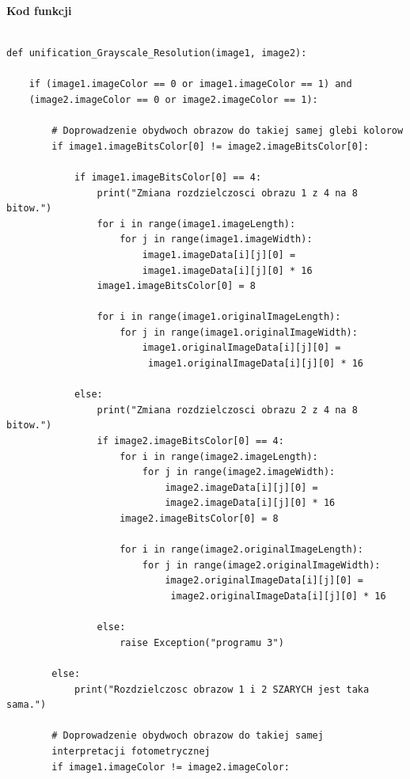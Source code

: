 \documentclass[magisterska,openany]{pracadypl}
\begin{document}
\newpage
\textbf{\Large Kod funkcji}
   
\lstset{language=Python}
\vspace{0.25cm}
\begin{lstlisting}[caption={Rozdzielczościowe ujednolicanie obrazów szarych}]

def unification_Grayscale_Resolution(image1, image2):
   
    if (image1.imageColor == 0 or image1.imageColor == 1) and 
    (image2.imageColor == 0 or image2.imageColor == 1):

        # Doprowadzenie obydwoch obrazow do takiej samej glebi kolorow
        if image1.imageBitsColor[0] != image2.imageBitsColor[0]:

            if image1.imageBitsColor[0] == 4:
                print("Zmiana rozdzielczosci obrazu 1 z 4 na 8 bitow.")
                for i in range(image1.imageLength):
                    for j in range(image1.imageWidth):
                        image1.imageData[i][j][0] = 
                        image1.imageData[i][j][0] * 16
                image1.imageBitsColor[0] = 8

                for i in range(image1.originalImageLength):
                    for j in range(image1.originalImageWidth):
                        image1.originalImageData[i][j][0] =
                         image1.originalImageData[i][j][0] * 16

            else:
                print("Zmiana rozdzielczosci obrazu 2 z 4 na 8 bitow.")
                if image2.imageBitsColor[0] == 4:
                    for i in range(image2.imageLength):
                        for j in range(image2.imageWidth):
                            image2.imageData[i][j][0] = 
                            image2.imageData[i][j][0] * 16
                    image2.imageBitsColor[0] = 8

                    for i in range(image2.originalImageLength):
                        for j in range(image2.originalImageWidth):
                            image2.originalImageData[i][j][0] =
                             image2.originalImageData[i][j][0] * 16

                else:
                    raise Exception("programu 3")

        else:
            print("Rozdzielczosc obrazow 1 i 2 SZARYCH jest taka sama.")

        # Doprowadzenie obydwoch obrazow do takiej samej 
        interpretacji fotometrycznej
        if image1.imageColor != image2.imageColor:


\end{lstlisting}
\end{document}

